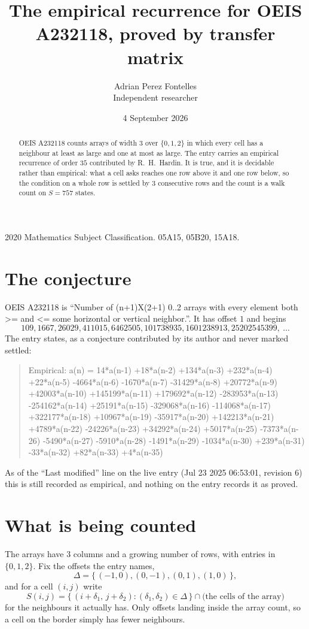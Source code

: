 \documentclass[11pt,a4paper]{article}
\title{The empirical recurrence for OEIS A232118, proved by transfer matrix}
\author{Adrian Perez Fontelles\\ \small Independent researcher}
\date{4 September 2026}
\theoremstyle{plain}
\theoremstyle{definition}
\begin{document}
\maketitle

\begin{abstract}
OEIS A232118 counts arrays of width $3$ over $\{0,1,2\}$ in which every cell has a neighbour at least as large and one at most as large. The entry carries an
empirical recurrence of order $35$ contributed by R.~H.~Hardin. It is true, and it is
decidable rather than empirical: what a cell asks reaches one row above it and one row below, so the
condition on a whole row is settled by $3$ consecutive rows and the count is a walk
count on $S=757$ states.
\end{abstract}

\noindent\small 2020 Mathematics Subject Classification. 05A15, 05B20, 15A18.\normalsize

\section{The conjecture}

OEIS A232118 is ``Number of (n+1)X(2+1) 0..2 arrays with every element both >= and <= some horizontal or vertical neighbor.''. It has offset $1$ and begins
\[
109, 1667, 26029, 411015, 6462505, 101738935, 1601238913, 25202545399,\ \dots
\]
The entry states, as a conjecture contributed by its author and never marked settled:
\begin{quote}
Empirical: a(n) = 14*a(n-1) +18*a(n-2) +134*a(n-3) +232*a(n-4) +22*a(n-5) -4664*a(n-6) -1670*a(n-7) -31429*a(n-8) +20772*a(n-9) +42003*a(n-10) +145199*a(n-11) +179692*a(n-12) -283953*a(n-13) -254162*a(n-14) +25191*a(n-15) -329068*a(n-16) -114068*a(n-17) +322177*a(n-18) +10967*a(n-19) -35917*a(n-20) +142213*a(n-21) +4789*a(n-22) -24226*a(n-23) +34292*a(n-24) +5017*a(n-25) -7373*a(n-26) -5490*a(n-27) -5910*a(n-28) -1491*a(n-29) -1034*a(n-30) +239*a(n-31) -33*a(n-32) +82*a(n-33) +4*a(n-35)
\end{quote}
As of the ``Last modified'' line on the live entry (Jul 23 2025 06:53:01, revision 6) this is still
recorded as empirical, and nothing on the entry records it as proved.

\section{What is being counted}

The arrays have $3$ columns and a growing number of rows, with entries in $\{0,1,2\}$. Fix the
offsets the entry names,
\[
\Delta=\{\,(-1,0), (0,-1), (0,1), (1,0)\,\},
\]
and for a cell $(i,j)$ write
\[
S(i,j)=\{\,(i+\delta_1,\,j+\delta_2) : (\delta_1,\delta_2)\in\Delta\,\}\cap
\text{(the cells of the array)}
\]
for the neighbours it actually has. Only offsets landing inside the array count, so a cell on
the border simply has fewer neighbours.
\end{document}
